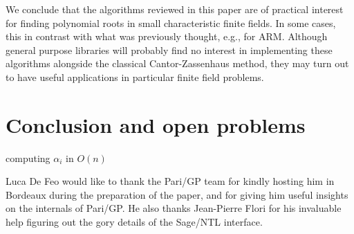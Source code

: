 \documentclass{sig-alternate}
\newcounter{algo}
\renewcommand{\paragraph}[1]{\smallskip\noindent{{\bf \rm #1.}}}
\begin{document}
We conclude that the algorithms reviewed in this paper are of
practical interest for finding polynomial roots in small
characteristic finite fields. In some cases, this in contrast with
what was previously thought, e.g., for ARM. Although general purpose
libraries will probably find no interest in implementing these
algorithms alongside the classical Cantor-Zassenhaus method, they may
turn out to have useful applications in particular finite field
problems.



\section{Conclusion and open problems}

computing $\alpha_i$ in $O(n)$

\paragraph{Aknowledgements} Luca De Feo would like to thank the
Pari/GP team for kindly hosting him in Bordeaux during the preparation
of the paper, and for giving him useful insights on the internals of
Pari/GP. He also thanks Jean-Pierre Flori for his invaluable help
figuring out the gory details of the Sage/NTL interface.



\end{document}
